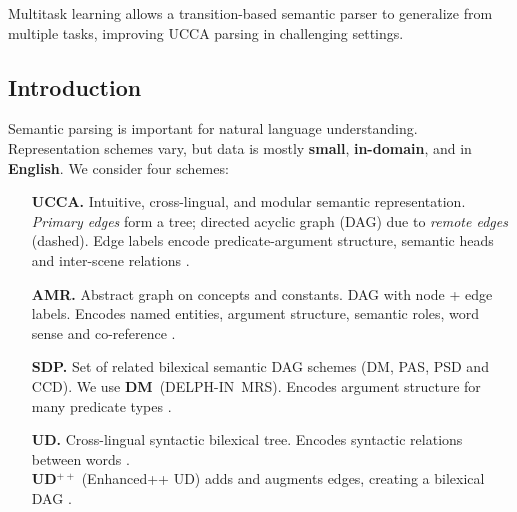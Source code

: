 \documentclass[a0,portrait]{a0poster}
\begin{document}
\vspace{1cm}
\titlespacing*{\section}{0pt}{8mm}{5mm}


\begin{adjustbox}{margin=3mm,frame,minipage=.6\linewidth,center}
\Large\color{Navy}
Multitask learning allows a transition-based semantic parser
to generalize from multiple tasks,
improving UCCA parsing in challenging settings.
\end{adjustbox}


\begin{multicols}{2}


\color{Black}

\section*{Introduction}

Semantic parsing is important for natural language understanding.
Representation schemes vary,
but data is mostly \textbf{small}, \textbf{in-domain}, and in \textbf{English}.
We consider four schemes:
\begin{itemize}[nosep,labelsep=1em]
\item[\color{violet} \textbf{UCCA.}] Intuitive, cross-lingual, and modular semantic representation.
    \textit{Primary edges} form a tree; directed acyclic graph (DAG) due to \textit{remote edges} (dashed).
    Edge labels encode predicate-argument structure, semantic heads and inter-scene relations
    \cite{abend2013universal}.
\item[\color{teal} \textbf{AMR.}] Abstract graph on concepts and constants.
    DAG with node + edge labels.
    Encodes named entities, argument structure, semantic roles, word sense and co-reference
    \cite{banarescu2013abstract}.
\item[\color{blue} \textbf{SDP.}] Set of related bilexical semantic DAG schemes (DM, PAS, PSD and CCD).
    We use \textbf{\color{blue} DM}~(DELPH-IN~MRS).
    Encodes argument structure for many predicate types \cite{oepen2016towards}.
\item[\color{purple} \textbf{UD.}] Cross-lingual syntactic bilexical tree.
    Encodes syntactic relations between words \cite{nivre2016universal}. \\
    {\color{purple} \textbf{UD$^{++}$}} (Enhanced++ UD) adds and augments edges, creating a bilexical DAG
    \cite{SCHUSTER16.779}.
\end{itemize}


\end{multicols}
\end{document}
